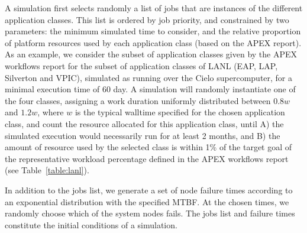 A simulation first selects randomly a list of jobs that are instances of the
different application classes. This list is ordered by job priority, and constrained
by two parameters: the minimum simulated time to consider, and the relative
proportion of platform resources used by each application class (based on the APEX
report). 
As an example,
we consider the subset of application classes given by the APEX workflows report for
the subset of application classes of LANL (EAP, LAP, Silverton and VPIC), simulated
as running over the Cielo supercomputer, for a minimal execution time
of 60 day. A
simulation will randomly instantiate one of the four classes, assigning a work
duration uniformly distributed between $0.8w$ and $1.2w$, where $w$ is the typical
walltime specified for the chosen application class, and count the resource allocated
for this application class, until A) the simulated execution would necessarily run
for at least 2 months, and B) the amount of resource used by the selected class is
within 1\% of the target goal of the representative workload percentage defined in
the APEX workflows report (see Table~\ref{table:lanl}).

In addition to the jobs list, we generate a set of node failure times according to an
exponential distribution with the specified MTBF. At the chosen times, we randomly
choose which of the system nodes fails.  The jobs list and failure times constitute
the initial conditions of a simulation.


